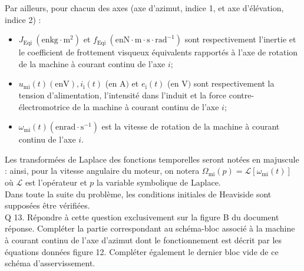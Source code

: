 \documentclass[10pt]{article}
\begin{document}
Par ailleurs, pour chacun des axes (axe d'azimut, indice 1, et axe d'élévation, indice 2) :

\begin{itemize}
  \item $J_{\text {Eqi }}\left(\mathrm{en} \mathrm{kg} \cdot \mathrm{m}^{2}\right)$ et $f_{\text {Eqi }}\left(\mathrm{en} \mathrm{N} \cdot \mathrm{m} \cdot \mathrm{s} \cdot \mathrm{rad}^{-1}\right)$ sont respectivement l'inertie et le coefficient de frottement visqueux équivalents rapportés à l'axe de rotation de la machine à courant continu de l'axe $i$;
  \item $u_{\mathrm{mi}}(t)(\mathrm{en} \mathrm{V}), i_{\mathrm{i}}(t)$ (en A$)$ et $e_{\mathrm{i}}(t)$ (en V$)$ sont respectivement la tension d'alimentation, l'intensité dans l'induit et la force contre-électromotrice de la machine à courant continu de l'axe $i$;
  \item $\omega_{\mathrm{mi}}(t)\left(\mathrm{en} \mathrm{rad} \cdot \mathrm{s}^{-1}\right)$ est la vitesse de rotation de la machine à courant continu de l'axe $i$.
\end{itemize}

Les transformées de Laplace des fonctions temporelles seront notées en majuscule : ainsi, pour la vitesse angulaire du moteur, on notera $\Omega_{\mathrm{mi}}(p)=\mathcal{L}\left[\omega_{\mathrm{mi}}(t)\right]$ où $\mathcal{L}$ est l'opérateur et $p$ la variable symbolique de Laplace.\\
Dans toute la suite du problème, les conditions initiales de Heaviside sont supposées être vérifiées.\\
Q 13. Répondre à cette question exclusivement sur la figure B du document réponse. Compléter la partie correspondant au schéma-bloc associé à la machine à courant continu de l'axe d'azimut dont le fonctionnement est décrit par les équations données figure 12. Compléter également le dernier bloc vide de ce schéma d'asservissement.
\end{document}
